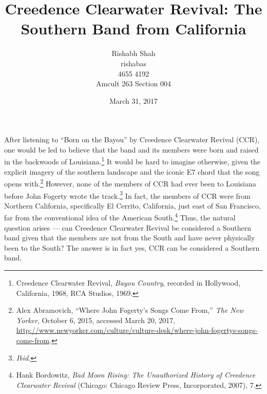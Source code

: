 \documentclass[10pt]{article}
\begin{document}
\title{Creedence Clearwater Revival: The Southern Band from California}

\author{
	Rishabh Shah\\
	rishabas\\
	4655 4192\\
	Amcult 263 Section 004}

\date{March 31, 2017}

\maketitle
\thispagestyle{empty}

\newpage
\clearpage
{}
\doublespacing

After listening to ``Born on the Bayou'' by Creedence Clearwater Revival (CCR), one would be led to believe that the band and its members were born and raised in the backwoods of Louisiana.\footnote{Creedence Clearwater Revival, \textit{Bayou Country}, recorded in Hollywood, California, 1968, RCA Studios, 1969.} It would be hard to imagine otherwise, given the explicit imagery of the southern landscape and the iconic E7 chord that the song opens with.\footnote{Alex Abramovich, ``Where John Fogerty's Songs Come From,'' \textit{The New Yorker}, October 6, 2015, accessed March 20, 2017, \url{http://www.newyorker.com/culture/culture-desk/where-john-fogertys-songs-come-from}.} However, none of the members of CCR had ever been to Louisiana before John Fogerty wrote the track.\footnote{\textit{Ibid.}} In fact, the members of CCR were from Northern California, specifically El Cerrito, California, just east of San Francisco, far from the conventional idea of the American South.\footnote{Hank Bordowitz, \textit{Bad Moon Rising: The Unauthorized History of Creedence Clearwater Revival} (Chicago: Chicago Review Press, Incorporated, 2007), 7.} Thus, the natural question arises --- can Creedence Clearwater Revival be considered a Southern band given that the members are not from the South and have never physically been to the South? The answer is in fact yes, CCR can be considered a Southern band.
\end{document}
